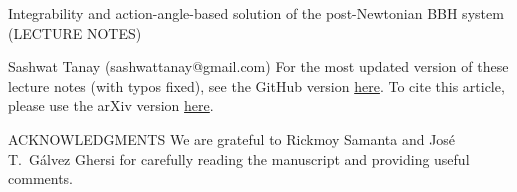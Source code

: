 \documentclass[12pt]{report}
\begin{document}
\begin{titlepage}


\begin{center}
{\Large Integrability and action-angle-based solution of the post-Newtonian BBH system}\\
(LECTURE NOTES)\\
\end{center}
\begin{center}
Sashwat Tanay (sashwattanay@gmail.com)
\linebreak
\linebreak
\linebreak
\linebreak
\linebreak
For the most updated version of these lecture notes (with typos fixed), 
see the GitHub version \href{https://github.com/sashwattanay/lectures_integrability_action-angles_PN_BBH/blob/gh-action-result/pdflatex/lecture_notes/main.pdf}{here}.
To cite this article, please use the arXiv version 
\href{https://arxiv.org/abs/2206.05799}{here}.
\end{center}
\newpage
\begin{center}
{\Large ACKNOWLEDGMENTS}
\linebreak
\linebreak
We are grateful to Rickmoy Samanta
and Jos\'e T.~G\'alvez Ghersi
for carefully reading the manuscript
and providing useful comments.
\end{center}
\end{titlepage}



\tableofcontents















\end{document}
